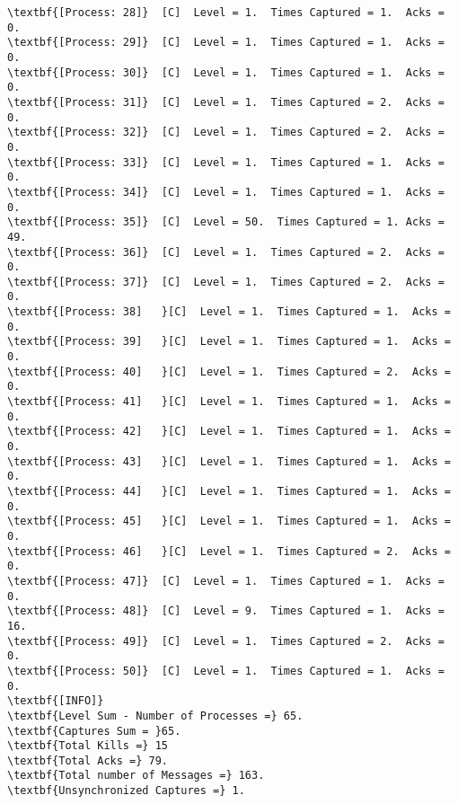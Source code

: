 \begin{Verbatim}[commandchars=\\\{\},codes={\catcode`$=3\catcode`_=8},frame=single,label=Test 6 output]
\textbf{[Process: 28]}	[C]  Level = 1.  Times Captured = 1.  Acks = 0.
\textbf{[Process: 29]}	[C]  Level = 1.  Times Captured = 1.  Acks = 0.
\textbf{[Process: 30]}	[C]  Level = 1.  Times Captured = 1.  Acks = 0.
\textbf{[Process: 31]}	[C]  Level = 1.  Times Captured = 2.  Acks = 0.
\textbf{[Process: 32]}	[C]  Level = 1.  Times Captured = 2.  Acks = 0.
\textbf{[Process: 33]}	[C]  Level = 1.  Times Captured = 1.  Acks = 0.
\textbf{[Process: 34]}	[C]  Level = 1.  Times Captured = 1.  Acks = 0.
\textbf{[Process: 35]}	[C]  Level = 50.  Times Captured = 1. Acks = 49.
\textbf{[Process: 36]}	[C]  Level = 1.  Times Captured = 2.  Acks = 0.
\textbf{[Process: 37]}	[C]  Level = 1.  Times Captured = 2.  Acks = 0.
\textbf{[Process: 38]	}[C]  Level = 1.  Times Captured = 1.  Acks = 0.
\textbf{[Process: 39]	}[C]  Level = 1.  Times Captured = 1.  Acks = 0.
\textbf{[Process: 40]	}[C]  Level = 1.  Times Captured = 2.  Acks = 0.
\textbf{[Process: 41]	}[C]  Level = 1.  Times Captured = 1.  Acks = 0.
\textbf{[Process: 42]	}[C]  Level = 1.  Times Captured = 1.  Acks = 0.
\textbf{[Process: 43]	}[C]  Level = 1.  Times Captured = 1.  Acks = 0.
\textbf{[Process: 44]	}[C]  Level = 1.  Times Captured = 1.  Acks = 0.
\textbf{[Process: 45]	}[C]  Level = 1.  Times Captured = 1.  Acks = 0.
\textbf{[Process: 46]	}[C]  Level = 1.  Times Captured = 2.  Acks = 0.
\textbf{[Process: 47]}	[C]  Level = 1.  Times Captured = 1.  Acks = 0.
\textbf{[Process: 48]}	[C]  Level = 9.  Times Captured = 1.  Acks = 16.
\textbf{[Process: 49]}	[C]  Level = 1.  Times Captured = 2.  Acks = 0.
\textbf{[Process: 50]}	[C]  Level = 1.  Times Captured = 1.  Acks = 0.
\textbf{[INFO]}		
\textbf{Level Sum - Number of Processes =} 65.	
\textbf{Captures Sum = }65.	
\textbf{Total Kills =} 15	
\textbf{Total Acks =} 79.
\textbf{Total number of Messages =} 163.
\textbf{Unsynchronized Captures =} 1.
	
	\end{Verbatim}

	\vspace{10pt}